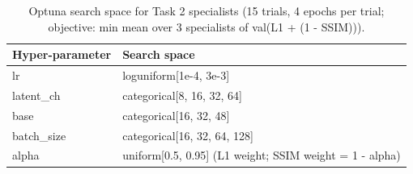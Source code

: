 \begin{table}[t]
\centering
\caption{Optuna search space for Task 2 specialists (15 trials, 4 epochs per trial; objective: min mean over 3 specialists of val(L1 + (1 - SSIM))).}
\label{tab:space_task2_specialists}
\footnotesize
\begin{tabular}{lp{5.6cm}}
\toprule
Hyper-parameter & Search space \\
\midrule
lr & loguniform[1e-4, 3e-3] \\
latent\_ch & categorical[8, 16, 32, 64] \\
base & categorical[16, 32, 48] \\
batch\_size & categorical[16, 32, 64, 128] \\
alpha & uniform[0.5, 0.95]  (L1 weight; SSIM weight = 1 - alpha) \\
\bottomrule
\end{tabular}
\end{table}
